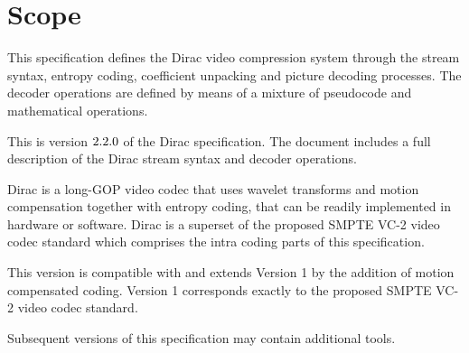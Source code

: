\section{Scope}
\label{introscope}

This specification defines the Dirac video compression system through the stream syntax,
 entropy coding, coefficient unpacking and picture decoding processes. The decoder
 operations are defined by means of a mixture of pseudocode and mathematical 
operations.
 
This is version $\text{\text{2}.\text{2}.\text{0}}$ of the Dirac specification. The document includes
a full description of the Dirac stream syntax and decoder operations.

Dirac is a long-GOP video codec that uses wavelet transforms and motion compensation
 together with entropy coding, that can be readily implemented in hardware or software.
Dirac is a superset of the proposed SMPTE VC-2 video codec standard which 
comprises the intra coding parts of this specification.

This version is compatible with and extends Version 1 by the addition of motion
 compensated coding. Version 1 corresponds exactly to the proposed SMPTE VC-2
 video codec standard.

Subsequent versions of this specification may contain additional tools.

